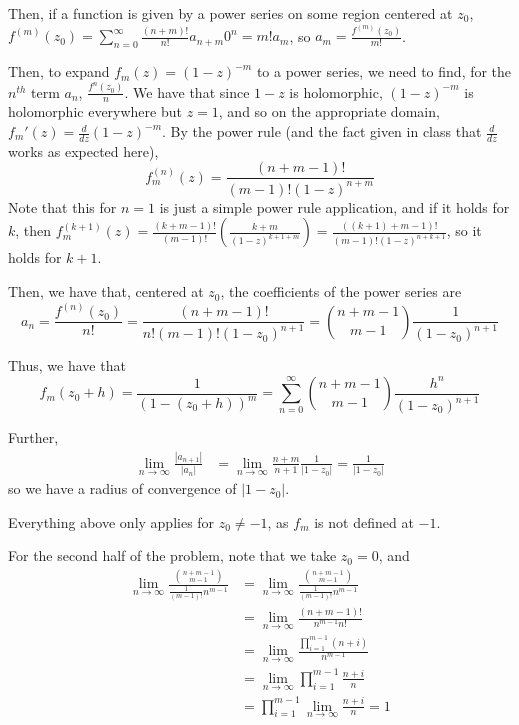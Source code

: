 \documentclass[12pt,letterpaper]{article}
\theoremstyle{definition}
\begin{document}
Then, if a function is given by a power series on some region centered at $z_{0}$, $f^{(m)}(z_{0}) = \sum_{n=0}^{\infty}\frac{(n+m)!}{n!}a_{n+m}0^{n} = m!a_{m}$, so $a_{m} = \frac{f^{(m)}(z_{0})}{m!}$.

Then, to expand $f_{m}(z) = (1-z)^{-m}$ to a power series, we need to find, for the $n^{th}$ term $a_{n}$, $\frac{f^{n}(z_{0})}{n}$. We have that since $1 - z$ is holomorphic, $(1-z)^{-m}$ is holomorphic everywhere but $z = 1$, and so on the appropriate domain, $f_{m}'(z) = \frac{d}{dz}(1-z)^{-m}$. By the power rule (and the fact given in class that $\frac{d}{dz}$ works as expected here),
\[
  f_{m}^{(n)}(z) = \frac{(n+m-1)!}{(m-1)!(1-z)^{n+m}}
\]
Note that this for $n = 1$ is just a simple power rule application, and if it holds for $k$, then $f^{(k+1)}_{m}(z) = \frac{(k+m-1)!}{(m-1)!}\left(\frac{k+m}{(1-z)^{k+1+m}}\right) = \frac{((k+1)+m-1)!}{(m-1)!(1-z)^{n+k+1}}$, so it holds for $k+1$.

Then, we have that, centered at $z_{0}$, the coefficients of the power series are
\[
  a_{n} = \frac{f^{(n)}(z_{0})}{n!} = \frac{(n+m-1)!}{n!(m-1)!(1-z_{0})^{n+1}} = \binom{n+m-1}{m-1}\frac{1}{(1-z_{0})^{n+1}}
\]

Thus, we have that
\[
  f_{m}(z_{0}+h) = \frac{1}{(1-(z_{0}+h))^{m}} = \sum_{n=0}^{\infty}\binom{n+m-1}{m-1}\frac{h^{n}}{(1-z_{0})^{n+1}}
\]

Further,
\begin{align*}
  \lim_{n \rightarrow \infty}\frac{|a_{n+1}|}{|a_{n}|} &= \lim_{n \rightarrow \infty} \frac{n+m}{n+1}\frac{1}{|1-z_{0}|} = \frac{1}{|1-z_{0}|}
\end{align*}
so we have a radius of convergence of $|1 - z_{0}|$.

Everything above only applies for $z_{0} \neq -1$, as $f_{m}$ is not defined at $-1$.

For the second half of the problem, note that we take $z_{0} = 0$, and
\begin{align*}
  \lim_{n \rightarrow \infty}\frac{\binom{n+m-1}{m-1}}{\frac{1}{(m-1)!}n^{m-1}} &= \lim_{n \rightarrow \infty}\frac{\binom{n+m-1}{m-1}}{\frac{1}{(m-1)!}n^{m-1}} \\
                                                                                &= \lim_{n \rightarrow \infty}\frac{(n+m-1)!}{n^{m-1}n!} \\
                                                                                &= \lim_{n \rightarrow \infty}\frac{\prod_{i=1}^{m-1}(n+i)}{n^{m-1}} \\
                                                                                &= \lim_{n \rightarrow \infty}\prod_{i=1}^{m-1}\frac{n+i}{n} \\
                                                                                &= \prod_{i=1}^{m-1}\lim_{n \rightarrow \infty}\frac{n+i}{n} = 1\\
\end{align*}
\end{document}
